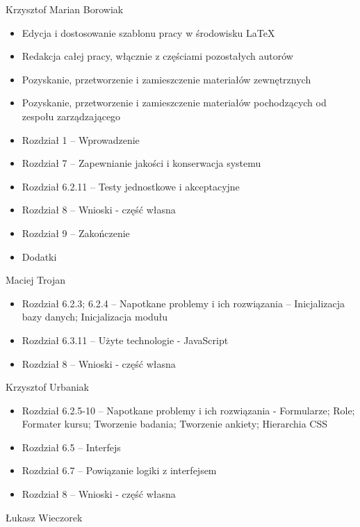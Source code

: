 \begin{description}
\item Krzysztof Marian Borowiak

\begin{itemize}
\item Edycja i dostosowanie szablonu pracy w środowisku \LaTeX
\item Redakcja całej pracy, włącznie z częściami pozostałych autorów
\item Pozyskanie, przetworzenie i zamieszczenie materiałów zewnętrznych
\item Pozyskanie, przetworzenie i zamieszczenie materiałów pochodzących od zespołu zarządzającego
\item Rozdział 1 -- Wprowadzenie
\item Rozdział 7 -- Zapewnianie jakości i konserwacja systemu
\item Rozdział 6.2.11 -- Testy jednostkowe i akceptacyjne
\item Rozdział 8 -- Wnioski - część własna
\item Rozdział 9 -- Zakończenie
\item Dodatki
\end{itemize}
\noindent

\item Maciej Trojan

\begin{itemize}
\item Rozdział 6.2.3; 6.2.4 -- Napotkane problemy i ich rozwiązania -- Inicjalizacja bazy danych; Inicjalizacja modułu
\item Rozdział 6.3.11 -- Użyte technologie - JavaScript
\item Rozdział 8 -- Wnioski - część własna
\end{itemize}
\noindent

\item Krzysztof Urbaniak

\begin{itemize}
\item Rozdział 6.2.5-10 -- Napotkane problemy i ich rozwiązania - Formularze; Role; Formater kursu; Tworzenie badania; Tworzenie ankiety; Hierarchia CSS
\item Rozdział 6.5 -- Interfejs
\item Rozdział 6.7 -- Powiązanie logiki z interfejsem
\item Rozdział 8 -- Wnioski - część własna
\end{itemize}
\noindent

\item Łukasz Wieczorek


\end{description}
